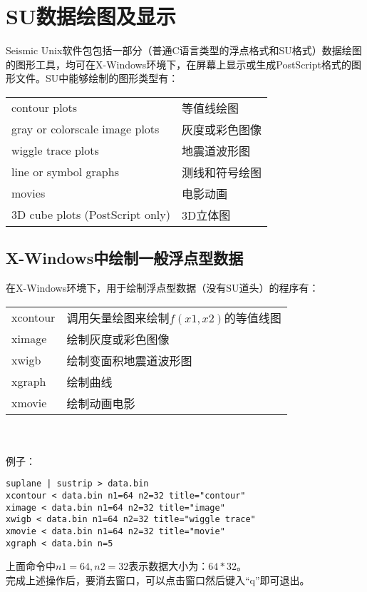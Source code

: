 \chapter{SU数据绘图及显示}
Seismic Unix软件包包括一部分（普通C语言类型的浮点格式和SU格式）数据绘图的图形工具，均可在X-Windows环境下，在屏幕上显示或生成PostScript格式的图形文件。SU中能够绘制的图形类型有：\\
\begin{tabular}{ll}
	\toprule
	contour plots & 等值线绘图\\	
	gray or colorscale image plots & 灰度或彩色图像\\	
	wiggle trace plots & 地震道波形图	\\
	line or symbol graphs & 测线和符号绘图\\
	movies & 电影动画\\
	3D cube plots (PostScript only) & 3D立体图\\
	\bottomrule
\end{tabular}

\section{X-Windows中绘制一般浮点型数据}
在X-Windows环境下，用于绘制浮点型数据（没有SU道头）的程序有：\\
\begin{tabular}{ll}
	\toprule
	xcontour & 调用矢量绘图来绘制$f(x1,x2)$的等值线图\\
	ximage & 绘制灰度或彩色图像\\
	xwigb & 绘制变面积地震道波形图\\
	xgraph & 绘制曲线\\
	xmovie & 绘制动画电影\\
	\bottomrule
\end{tabular}\\\\
例子：
\begin{lstlisting}
suplane | sustrip > data.bin
xcontour < data.bin n1=64 n2=32 title="contour" 
ximage < data.bin n1=64 n2=32 title="image" 
xwigb < data.bin n1=64 n2=32 title="wiggle trace" 
xmovie < data.bin n1=64 n2=32 title="movie"
xgraph < data.bin n=5 
\end{lstlisting}
上面命令中$n1=64,n2=32$表示数据大小为：$64*32$。\\
完成上述操作后，要消去窗口，可以点击窗口然后键入“q”即可退出。

